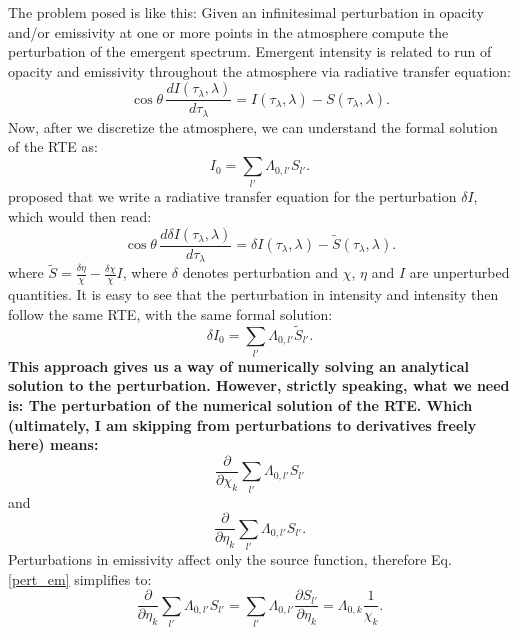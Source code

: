 \documentclass[referee]{aa}
\begin{document}
The problem posed is like this: Given an infinitesimal perturbation in opacity and/or emissivity at one or more points in the atmosphere compute the perturbation of the emergent spectrum. Emergent intensity is related to run of opacity and emissivity throughout the atmosphere via radiative transfer equation:
\begin{equation}
 \cos\theta\,\frac{d I(\tau_{\lambda}, \lambda)}{d\tau_{\lambda}} = I(\tau_{\lambda},\lambda) - S(\tau_{\lambda},\lambda). 
 \label{RTE2a}
\end{equation}
Now, after we discretize the atmosphere, we can understand the formal solution of the RTE as: 
\begin{equation}
 I_0 = \sum_{l'} \Lambda_{0,l'} S_{l'}.
 \label{lambdamatrixa}
\end{equation}
\citet{dtibook} proposed that we write a radiative transfer equation for the perturbation $\delta I$, which would then read:
\begin{equation}
 \cos\theta\,\frac{d \delta I(\tau_{\lambda}, \lambda)}{d\tau_{\lambda}} = \delta I(\tau_{\lambda},\lambda) - \tilde{S}(\tau_{\lambda},\lambda). 
 \label{RTE2b}
\end{equation}
where $\tilde S = \frac{\delta \eta}{\chi} - \frac{\delta \chi}{\chi} I$, where $\delta$ denotes perturbation and $\chi$, $\eta$ and $I$ are unperturbed quantities. It is easy to see that the perturbation in intensity and intensity then follow the same RTE, with the same formal solution:
\begin{equation}
 \delta I_0 = \sum_{l'} \Lambda_{0,l'} \tilde{S}_{l'}.
 \label{fspert}
\end{equation}
\textbf{This approach gives us a way of numerically solving an analytical solution to the perturbation. However, strictly speaking, what we need is: The perturbation of the numerical solution of the RTE. Which (ultimately, I am skipping from perturbations to derivatives freely here) means:}
\begin{equation}
 \frac{\partial}{\partial \chi_k} \sum_{l'} \Lambda_{0,l'} S_{l'}
 \label{num_pert}
\end{equation}
and 
\begin{equation}
 \frac{\partial}{\partial \eta_k} \sum_{l'} \Lambda_{0,l'} S_{l'}.
 \label{pert_em}
\end{equation}
Perturbations in emissivity affect only the source function, therefore Eq.\,\ref{pert_em} simplifies to:
\begin{equation}
 \frac{\partial}{\partial \eta_k} \sum_{l'} \Lambda_{0,l'} S_{l'} = \sum_{l'} \Lambda_{0,l'} \frac{\partial S_{l'}}{\partial \eta_k} = \Lambda_{0,k}\frac{1}{\chi_k}.
\end{equation}
\end{document}
